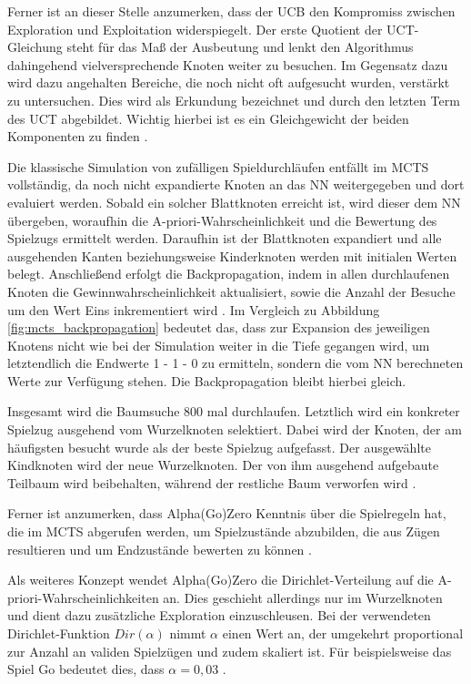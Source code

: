 \documentclass[12pt,a4paper]{article}
\begin{document}
Ferner ist an dieser Stelle anzumerken, dass der UCB den Kompromiss zwischen Exploration und Exploitation widerspiegelt. Der erste Quotient der UCT-Gleichung steht für das Maß der Ausbeutung und lenkt den Algorithmus dahingehend vielversprechende Knoten weiter zu besuchen. Im Gegensatz dazu wird dazu angehalten Bereiche, die noch nicht oft aufgesucht wurden, verstärkt zu untersuchen. Dies wird als Erkundung bezeichnet und durch den letzten Term des UCT abgebildet. Wichtig hierbei ist es ein Gleichgewicht der beiden Komponenten zu finden \cite{Browne2012}.

Die klassische Simulation von zufälligen Spieldurchläufen entfällt im MCTS vollständig, da noch nicht expandierte Knoten an das NN weitergegeben und dort evaluiert werden. Sobald ein solcher Blattknoten erreicht ist, wird dieser dem NN übergeben, woraufhin die A-priori-Wahrscheinlichkeit und die Bewertung des Spielzugs ermittelt werden. Daraufhin ist der Blattknoten expandiert und alle ausgehenden Kanten beziehungsweise Kinderknoten werden mit initialen Werten belegt.
Anschließend erfolgt die Backpropagation, indem in allen durchlaufenen Knoten die Gewinnwahrscheinlichkeit aktualisiert, sowie die Anzahl der Besuche um den Wert Eins inkrementiert wird \cite{Silver2017}. Im Vergleich zu Abbildung \ref{fig:mcts_backpropagation} bedeutet das, dass zur Expansion des jeweiligen Knotens nicht wie bei der Simulation weiter in die Tiefe gegangen wird, um letztendlich die Endwerte \glqq{}1\grqq{} - \glqq{}1\grqq{} - \glqq{}0\grqq{} zu ermitteln, sondern die vom NN berechneten Werte zur Verfügung stehen. Die Backpropagation bleibt hierbei gleich.

Insgesamt wird die Baumsuche 800 mal durchlaufen\cite{SilverHubert2017}. Letztlich wird ein konkreter Spielzug ausgehend vom Wurzelknoten selektiert. Dabei wird der Knoten, der am häufigsten besucht wurde als der beste Spielzug aufgefasst. Der ausgewählte Kindknoten wird der neue Wurzelknoten. Der von ihm ausgehend aufgebaute Teilbaum wird beibehalten, während der restliche Baum verworfen wird \cite{Silver2017}.

Ferner ist anzumerken, dass Alpha(Go)Zero Kenntnis über die Spielregeln hat, die im MCTS abgerufen werden, um Spielzustände abzubilden, die aus Zügen resultieren und um Endzustände bewerten zu können \cite{Silver2017} \cite{SilverHubert2017}. 

Als weiteres Konzept wendet Alpha(Go)Zero die Dirichlet-Verteilung auf die A-priori-Wahrscheinlichkeiten an. Dies geschieht allerdings nur im Wurzelknoten und dient dazu zusätzliche Exploration einzuschleusen. Bei der verwendeten Dirichlet-Funktion $Dir(\alpha)$ nimmt $\alpha$ einen Wert an, der umgekehrt proportional zur Anzahl an validen Spielzügen und zudem skaliert ist. Für beispielsweise das Spiel Go bedeutet dies, dass $\alpha = 0,03$ \cite{SilverHubert2017}. 
\end{document}
